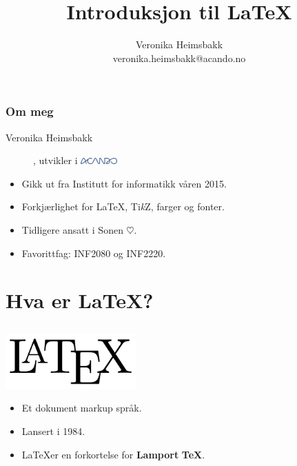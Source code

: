 \documentclass[10pt]{beamer}
\title{Introduksjon til \LaTeX}
\author{Veronika Heimsbakk\\veronika.heimsbakk@acando.no}
\date{}
\begin{document}
\begin{frame}\frametitle{}
\maketitle
\end{frame}

\begin{frame}\frametitle{Om meg}
\begin{description}
\item[Veronika Heimsbakk], utvikler i \includegraphics[width=1.4cm]{img/acandologo.png}
\end{description}

\begin{itemize}
	\item
	Gikk ut fra Institutt for informatikk våren 2015.
	\item
	Forkjærlighet for \LaTeX, Ti\textit{k}Z, farger og fonter.
	\item
	Tidligere ansatt i Sonen $\heartsuit$.
	\item
	Favorittfag: INF2080 og INF2220.
\end{itemize}
\end{frame}

\section{Hva er \LaTeX?}
\subsection{}
\begin{frame}\frametitle{}

\begin{center}
\includegraphics[width=5cm]{img/latexlogo.png}
\end{center}

\begin{itemize}
	\item
	Et dokument markup språk.
	\item
	Lansert i 1984.
	\item
	\LaTeX er en forkortelse for \textbf{Lamport} \textbf{\TeX}.
\end{itemize}
\end{frame}
\end{document}
